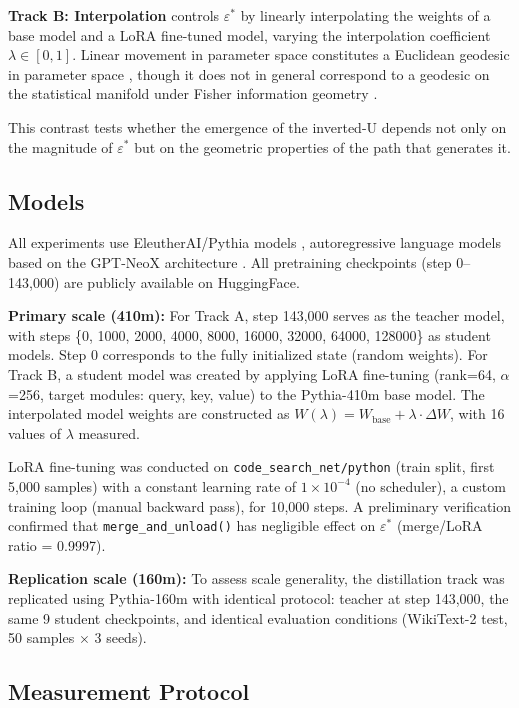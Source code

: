 \documentclass[11pt,a4paper]{article}
\begin{document}
\textbf{Track B: Interpolation} controls $\varepsilon^*$ by linearly interpolating the
weights of a base model and a LoRA fine-tuned model, varying the interpolation coefficient
$\lambda \in [0,1]$. Linear movement in parameter space constitutes a Euclidean geodesic
in parameter space \cite{amari2016,frankle2020,wortsman2022}, though it does not in general
correspond to a geodesic on the statistical manifold under Fisher information geometry
\cite{amari2000}.

This contrast tests whether the emergence of the inverted-U depends not only on the
magnitude of $\varepsilon^*$ but on the geometric properties of the path that generates it.

\subsection{Models}

All experiments use EleutherAI/Pythia models \cite{biderman2023}, autoregressive language
models based on the GPT-NeoX architecture \cite{black2022}. All pretraining checkpoints
(step 0--143,000) are publicly available on HuggingFace.

\textbf{Primary scale (410m):} For Track A, step 143,000 serves as the teacher model, with
steps \{0, 1000, 2000, 4000, 8000, 16000, 32000, 64000, 128000\} as student models. Step 0
corresponds to the fully initialized state (random weights). For Track B, a student model was
created by applying LoRA fine-tuning \cite{hu2022} (rank=64, $\alpha$=256, target modules:
query, key, value) to the Pythia-410m base model. The interpolated model weights are
constructed as $W(\lambda) = W_\mathrm{base} + \lambda \cdot \Delta W$, with 16 values of
$\lambda$ measured.

LoRA fine-tuning was conducted on \texttt{code\_search\_net/python} (train split, first
5,000 samples) with a constant learning rate of $1 \times 10^{-4}$ (no scheduler), a custom
training loop (manual backward pass), for 10,000 steps. A preliminary verification confirmed
that \texttt{merge\_and\_unload()} has negligible effect on $\varepsilon^*$
(merge/LoRA ratio = 0.9997).

\textbf{Replication scale (160m):} To assess scale generality, the distillation track was
replicated using Pythia-160m with identical protocol: teacher at step 143,000, the same 9
student checkpoints, and identical evaluation conditions (WikiText-2 test, 50 samples
$\times$ 3 seeds).

\subsection{Measurement Protocol}
\end{document}
